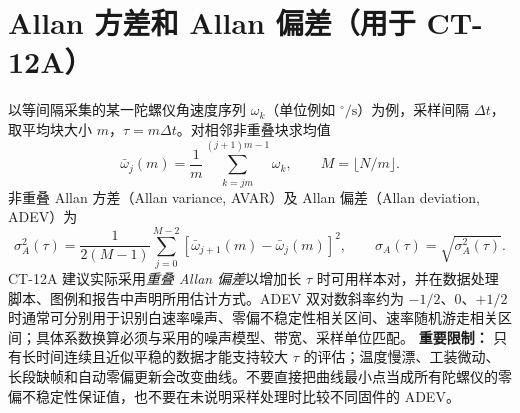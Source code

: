 \section{Allan 方差和 Allan 偏差（用于 CT-12A）}
以等间隔采集的某一陀螺仪角速度序列 $\omega_k$（单位例如 $^\circ/\mathrm s$）为例，采样间隔 $\Delta t$，取平均块大小 $m$，$\tau=m\Delta t$。对相邻非重叠块求均值
\begin{equation}
\bar\omega_j(m)=\frac1m\sum_{k=jm}^{(j+1)m-1}\omega_k,\qquad M=\lfloor N/m\rfloor.
\end{equation}
非重叠 Allan 方差（Allan variance, AVAR）及 Allan 偏差（Allan deviation, ADEV）为
\begin{equation}
\sigma_A^2(\tau)=\frac{1}{2(M-1)}\sum_{j=0}^{M-2}\left[\bar\omega_{j+1}(m)-\bar\omega_j(m)\right]^2,\qquad
\sigma_A(\tau)=\sqrt{\sigma_A^2(\tau)}.
\end{equation}
CT-12A 建议实际采用\emph{重叠 Allan 偏差}以增加长 $\tau$ 时可用样本对，并在数据处理脚本、图例和报告中声明所用估计方式。ADEV 双对数斜率约为 $-1/2$、$0$、$+1/2$ 时通常可分别用于识别白速率噪声、零偏不稳定性相关区间、速率随机游走相关区间；具体系数换算必须与采用的噪声模型、带宽、采样单位匹配。
\textbf{重要限制：} 只有长时间连续且近似平稳的数据才能支持较大 $\tau$ 的评估；温度慢漂、工装微动、长段缺帧和自动零偏更新会改变曲线。不要直接把曲线最小点当成所有陀螺仪的零偏不稳定性保证值，也不要在未说明采样处理时比较不同固件的 ADEV。
